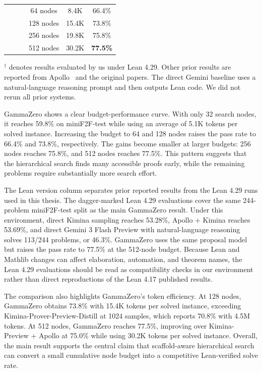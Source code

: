 \begin{table}[t]
{\begin{tabular}{@{}llcccc@{}}
&
&
& 64 nodes
& 8.4K
& 66.4\% \\

&
&
& 128 nodes
& 15.4K
& 73.8\% \\

&
&
& 256 nodes
& 19.8K
& 75.8\% \\

&
&
& 512 nodes
& 30.2K
& \textbf{77.5\%} \\

\bottomrule
\end{tabular}
}
\vspace{0.3em}

\footnotesize{
$^\dagger$ denotes results evaluated by us under Lean 4.29.
Other prior results are reported from Apollo~\citep{apollo} and the original
papers. The direct Gemini baseline uses a natural-language reasoning prompt and
then outputs Lean code. We did not rerun all prior systems.
}
\end{table}

GammaZero shows a clear budget-performance curve. With only 32 search nodes, it reaches 59.8\% on
miniF2F-test while using an average of 5.1K tokens per solved instance. Increasing the budget to 64
and 128 nodes raises the pass rate to 66.4\% and 73.8\%, respectively. The gains become smaller at
larger budgets: 256 nodes reaches 75.8\%, and 512 nodes reaches 77.5\%. This pattern suggests that
the hierarchical search finds many accessible proofs early, while the remaining problems require
substantially more search effort.

The Lean version column separates prior reported results from the Lean 4.29 runs used in this thesis.
The dagger-marked Lean 4.29 evaluations cover the same 244-problem miniF2F-test split as the main
GammaZero result. Under this environment, direct Kimina sampling reaches 53.28\%, Apollo + Kimina
reaches 53.69\%, and direct Gemini 3 Flash Preview with natural-language reasoning solves 113/244
problems, or 46.3\%.
GammaZero uses the same proposal model but raises the pass rate to 77.5\% at the 512-node budget.
Because Lean and Mathlib changes can affect elaboration, automation, and theorem names, the Lean
4.29 evaluations should be read as compatibility checks in our environment rather than direct
reproductions of the Lean 4.17 published results.

The comparison also highlights GammaZero's token efficiency. At 128 nodes, GammaZero obtains
73.8\% with 15.4K tokens per solved instance, exceeding Kimina-Prover-Preview-Distill at 1024
samples, which reports 70.8\% with 4.5M tokens. At 512 nodes, GammaZero reaches 77.5\%, improving
over Kimina-Preview + Apollo at 75.0\% while using 30.2K tokens per solved instance. Overall, the
main result supports the central claim that scaffold-aware hierarchical search can convert a small
cumulative node budget into a competitive Lean-verified solve rate.

